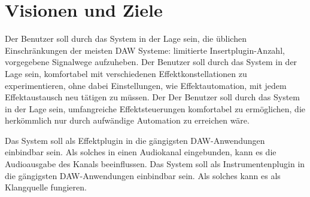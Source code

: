 \section{Visionen und Ziele}


 Der Benutzer soll durch das System in der Lage sein, die üblichen Einschränkungen der meisten DAW Systeme: limitierte Insertplugin-Anzahl, vorgegebene Signalwege  aufzuheben.
 Der Benutzer soll durch das System in der Lage sein, komfortabel mit verschiedenen Effektkonstellationen zu experimentieren, ohne dabei Einstellungen, wie Effektautomation, mit jedem Effektaustausch neu tätigen zu müssen.
 Der Der Benutzer soll durch das System in der Lage sein, umfangreiche Effektsteuerungen komfortabel zu ermöglichen, die herkömmlich nur durch aufwändige Automation zu erreichen wäre.

 Das System soll als Effektplugin in die gängigsten DAW-Anwendungen einbindbar sein. Als solches in einen Audiokanal eingebunden, kann es die Audioausgabe des Kanals beeinflussen. 
 Das System soll als Instrumentenplugin in die gängigsten DAW-Anwendungen einbindbar sein. Als solches kann es als Klangquelle fungieren.